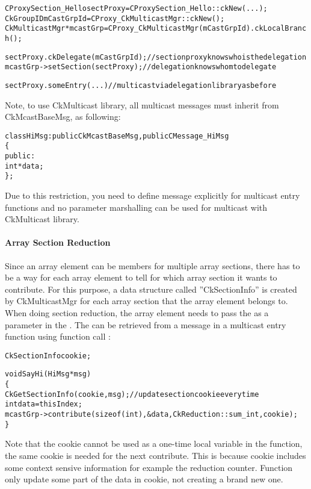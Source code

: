 \begin{alltt}
  CProxySection_Hello sectProxy = CProxySection_Hello::ckNew(...);
  CkGroupID mCastGrpId = CProxy_CkMulticastMgr::ckNew();
  CkMulticastMgr *mcastGrp = CProxy_CkMulticastMgr(mCastGrpId).ckLocalBranch();

  sectProxy.ckDelegate(mCastGrpId);  //section proxy knows who is the delegation
  mcastGrp->setSection(sectProxy);   //delegation knows whom to delegate

  sectProxy.someEntry(...)           //multicast via delegation library as before
\end{alltt}

Note, to use CkMulticast library, all multicast messages must inherit from 
CkMcastBaseMsg, as following:

\begin{alltt}
class HiMsg : public CkMcastBaseMsg, public CMessage_HiMsg
\{
public:
  int *data;
\};
\end{alltt}

Due to this restriction, you need to define message explicitly for multicast 
entry functions and no parameter marshalling can be used for multicast with 
CkMulticast library.

\paragraph{Array Section Reduction} 

Since an array element can be members for multiple array sections, 
there has to be a way for each array element to tell for which array
section it wants to contribute. For this purpose, a data structure 
called ''CkSectionInfo'' is created by CkMulticastMgr for each 
array section that the array element belongs to.
When doing section reduction, the array element needs to pass the 
 as a parameter in the . 
The  can be retrieved
from a message in a multicast entry function using function call 
:

\begin{alltt}
  CkSectionInfo cookie;

  void SayHi(HiMsg *msg)
  \{
    CkGetSectionInfo(cookie, msg);     // update section cookie every time
    int data = thisIndex;
    mcastGrp->contribute(sizeof(int), &data, CkReduction::sum_int, cookie);
  \}
\end{alltt}

Note that the cookie cannot be used as a one-time local variable in the 
function, the same cookie is needed for the next contribute. This is 
because cookie includes some context sensive information for example the 
reduction counter. Function  only update some part 
of the data in cookie, not creating a brand new one.

